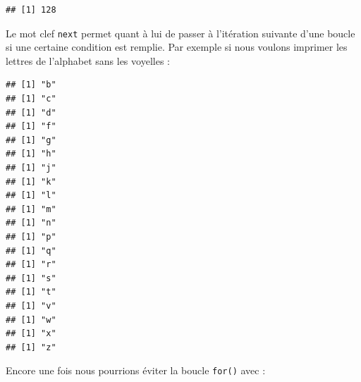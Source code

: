 \documentclass[
]{book}
\newenvironment{Shaded}{\begin{snugshade}}{\end{snugshade}}
\newcommand{\ControlFlowTok}[1]{\textcolor[rgb]{0.13,0.29,0.53}{\textbf{#1}}}
\newcommand{\DecValTok}[1]{\textcolor[rgb]{0.00,0.00,0.81}{#1}}
\newcommand{\KeywordTok}[1]{\textcolor[rgb]{0.13,0.29,0.53}{\textbf{#1}}}
\newcommand{\NormalTok}[1]{#1}
\newcommand{\OperatorTok}[1]{\textcolor[rgb]{0.81,0.36,0.00}{\textbf{#1}}}
\newcommand{\StringTok}[1]{\textcolor[rgb]{0.31,0.60,0.02}{#1}}
\begin{document}
\begin{Shaded}
\end{Shaded}

\begin{verbatim}
## [1] 128
\end{verbatim}

Le mot clef \texttt{next} permet quant à lui de passer à l'itération suivante d'une boucle si une certaine condition est remplie. Par exemple si nous voulons imprimer les lettres de l'alphabet sans les voyelles :

\begin{Shaded}
\end{Shaded}

\begin{verbatim}
## [1] "b"
## [1] "c"
## [1] "d"
## [1] "f"
## [1] "g"
## [1] "h"
## [1] "j"
## [1] "k"
## [1] "l"
## [1] "m"
## [1] "n"
## [1] "p"
## [1] "q"
## [1] "r"
## [1] "s"
## [1] "t"
## [1] "v"
## [1] "w"
## [1] "x"
## [1] "z"
\end{verbatim}

Encore une fois nous pourrions éviter la boucle \texttt{for()} avec :

\begin{Shaded}
\end{Shaded}
\end{document}
